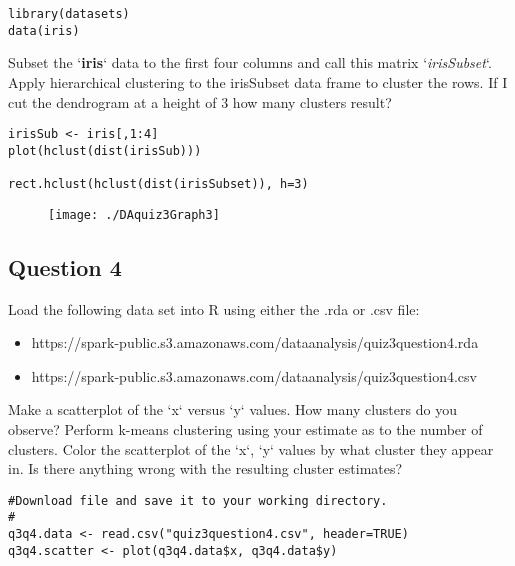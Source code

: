\documentclass[12pt]{article}
\begin{document}
\begin{framed}
\begin{verbatim}
library(datasets)
data(iris)
\end{verbatim}
\end{framed}

Subset the `\textbf{iris}` data to the first four columns and call this matrix
`\textit{irisSubset}`. Apply hierarchical clustering to the irisSubset data frame to
cluster the rows. If I cut the dendrogram at a height of 3 how many clusters
result?

\begin{framed}
\begin{verbatim}
irisSub <- iris[,1:4]
plot(hclust(dist(irisSub)))

rect.hclust(hclust(dist(irisSubset)), h=3)
\end{verbatim}
\end{framed}
\begin{figure}[h!]
\centering
\texttt{[image: ./DAquiz3Graph3]}
\caption{}
\label{fig:DAquiz3Graph2}
\end{figure}


\newpage
\subsection*{Question 4}

Load the following data set into R using either the .rda or .csv file: 

\begin{itemize}
\item https://spark-public.s3.amazonaws.com/dataanalysis/quiz3question4.rda 
\item  https://spark-public.s3.amazonaws.com/dataanalysis/quiz3question4.csv 
\end{itemize}
Make a scatterplot of the `x` versus `y` values. How many clusters do you
observe? Perform k-means clustering using your estimate as to the number of
clusters. Color the scatterplot of the `x`, `y` values by what cluster they
appear in. Is there anything wrong with the resulting cluster estimates?

\begin{framed}
\begin{verbatim}
#Download file and save it to your working directory.
#
q3q4.data <- read.csv("quiz3question4.csv", header=TRUE)
q3q4.scatter <- plot(q3q4.data$x, q3q4.data$y)
\end{verbatim}
\end{framed}
\end{document}
